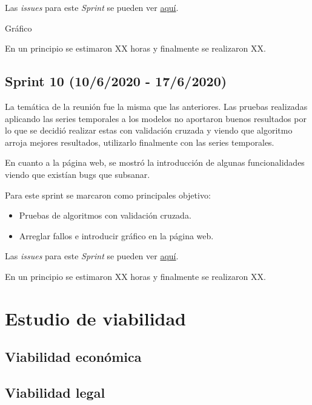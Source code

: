 Las \emph{issues} para este \emph{Sprint} se pueden ver \href{https://github.com/psnti/TFG-Pablo-Santidrian-Tudanca/milestone/9}{aquí}.

Gráfico

En un principio se estimaron XX horas y finalmente se realizaron XX.

\subsection{Sprint 10 (10/6/2020 - 17/6/2020)}\label{Sprint-10}

La temática de la reunión fue la misma que las anteriores. Las pruebas realizadas aplicando las series temporales a los modelos no aportaron buenos resultados por lo que se decidió realizar estas con validación cruzada y viendo que algoritmo arroja mejores resultados, utilizarlo finalmente con las series temporales.

En cuanto a la página web, se mostró la introducción de algunas funcionalidades viendo que existían bugs que subsanar.

Para este sprint se marcaron como principales objetivo:
\begin{itemize}
	\item Pruebas de algoritmos con validación cruzada.
	\item Arreglar fallos e introducir gráfico en la página web.
\end{itemize} 

Las \emph{issues} para este \emph{Sprint} se pueden ver \href{https://github.com/psnti/TFG-Pablo-Santidrian-Tudanca/milestone/10}{aquí}.


En un principio se estimaron XX horas y finalmente se realizaron XX.

\section{Estudio de viabilidad}

\subsection{Viabilidad económica}

\subsection{Viabilidad legal}


